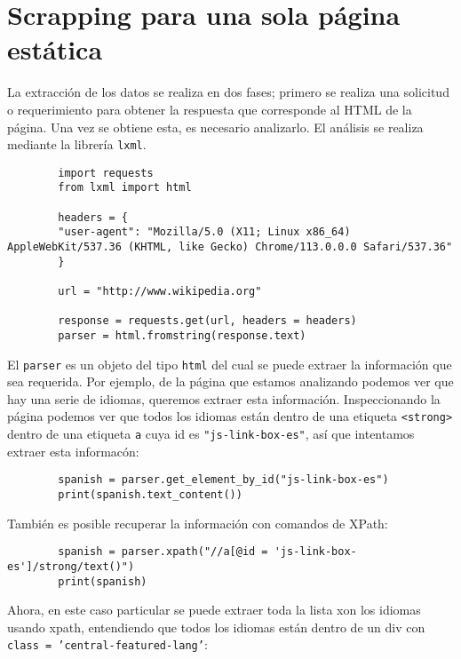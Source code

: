         
    \section{Scrapping para una sola página estática}

    La extracción de los datos se realiza en dos fases; primero se realiza una solicitud o requerimiento para obtener la respuesta que corresponde al HTML de la página. Una vez se obtiene esta, es necesario analizarlo. El análisis se realiza mediante la librería \texttt{lxml}.

    \begin{verbatim}
        import requests
        from lxml import html

        headers = {
        "user-agent": "Mozilla/5.0 (X11; Linux x86_64) AppleWebKit/537.36 (KHTML, like Gecko) Chrome/113.0.0.0 Safari/537.36"
        }

        url = "http://www.wikipedia.org"

        response = requests.get(url, headers = headers)
        parser = html.fromstring(response.text)
    \end{verbatim}

    El \texttt{parser} es un objeto del tipo \texttt{html} del cual se puede extraer la información que sea requerida. Por ejemplo, de la página que estamos analizando podemos ver que hay una serie de idiomas, queremos extraer esta información. Inspeccionando la página podemos ver que todos los idiomas están dentro de una etiqueta \texttt{<strong>} dentro de una etiqueta \texttt{a} cuya id es \texttt{"js-link-box-es"}, así que intentamos extraer esta informacón:

    \begin{verbatim}
        spanish = parser.get_element_by_id("js-link-box-es")
        print(spanish.text_content())
    \end{verbatim}

    También es posible recuperar la información con comandos de XPath:

    \begin{verbatim}
        spanish = parser.xpath("//a[@id = 'js-link-box-es']/strong/text()")
        print(spanish)
    \end{verbatim}

    Ahora, en este caso particular se puede extraer toda la lista xon los idiomas usando xpath, entendiendo que todos los idiomas están dentro de un div con \texttt{class = 'central-featured-lang'}:


